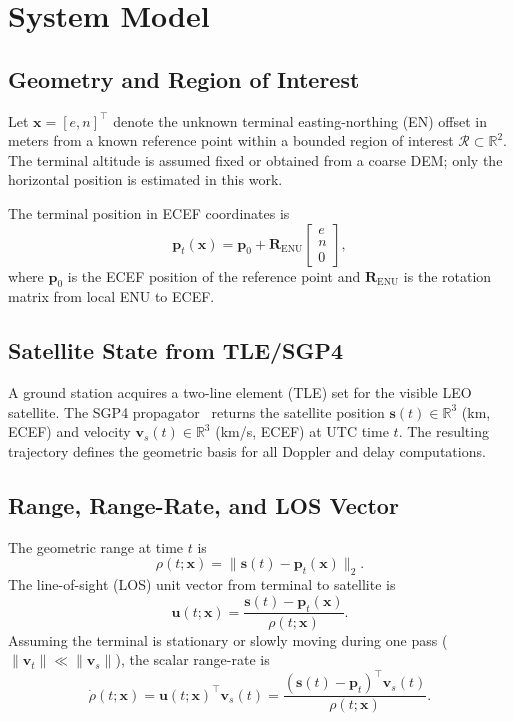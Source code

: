 \section{System Model}\label{sec:system_model}

\subsection{Geometry and Region of Interest}
Let $\mathbf{x} = [e, n]^{\top}$ denote the unknown terminal easting-northing (EN)
offset in meters from a known reference point within a bounded region of interest
$\mathcal{R} \subset \mathbb{R}^2$.  The terminal altitude is assumed fixed or
obtained from a coarse DEM; only the horizontal position is estimated in this
work.

The terminal position in ECEF coordinates is
\begin{equation}
  \mathbf{p}_t(\mathbf{x}) = \mathbf{p}_0 + \mathbf{R}_{\text{ENU}} \begin{bmatrix} e \\ n \\ 0 \end{bmatrix},
  \label{eq:terminal_ecef}
\end{equation}
where $\mathbf{p}_0$ is the ECEF position of the reference point and
$\mathbf{R}_{\text{ENU}}$ is the rotation matrix from local ENU to ECEF.

\subsection{Satellite State from TLE/SGP4}
A ground station acquires a two-line element (TLE) set for the visible LEO
satellite.  The SGP4 propagator~\cite{vallado_spacetrack_2006} returns the satellite position
$\mathbf{s}(t) \in \mathbb{R}^3$ (km, ECEF) and velocity
$\mathbf{v}_s(t) \in \mathbb{R}^3$ (km/s, ECEF) at UTC time $t$.  The resulting
trajectory defines the geometric basis for all Doppler and delay computations.

\subsection{Range, Range-Rate, and LOS Vector}
The geometric range at time $t$ is
\begin{equation}
  \rho(t; \mathbf{x}) = \bigl\|\mathbf{s}(t) - \mathbf{p}_t(\mathbf{x})\bigr\|_2 .
  \label{eq:range}
\end{equation}
The line-of-sight (LOS) unit vector from terminal to satellite is
\begin{equation}
  \mathbf{u}(t; \mathbf{x}) = \frac{\mathbf{s}(t) - \mathbf{p}_t(\mathbf{x})}
                                   {\rho(t; \mathbf{x})} .
  \label{eq:los_unit}
\end{equation}
Assuming the terminal is stationary or slowly moving during one pass
($\|\mathbf{v}_t\| \ll \|\mathbf{v}_s\|$), the scalar range-rate is
\begin{equation}
  \dot{\rho}(t; \mathbf{x})
  = \mathbf{u}(t; \mathbf{x})^\top \mathbf{v}_s(t)
  = \frac{(\mathbf{s}(t) - \mathbf{p}_t)^\top \mathbf{v}_s(t)}
          {\rho(t; \mathbf{x})} .
  \label{eq:range_rate}
\end{equation}

